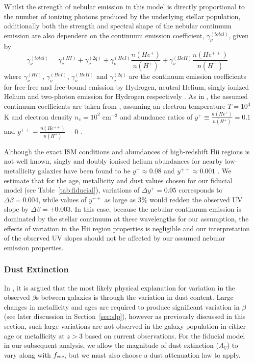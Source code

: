 Whilst the strength of nebular emission in this model is directly proportional to the number of ionizing photons produced by the underlying stellar population, additionally both the strength and spectral shape of the nebular continuum emission are also dependent on the continuum emission coefficient, $\gamma^{(total)}_{\nu}$, given by
\begin{equation}\label{eq:cont_sep}
\gamma^{(total)}_{\nu} = \gamma^{(HI)}_{\nu} + \gamma^{(2q)}_{\nu} +  \gamma^{(HeI)}_{\nu}\frac{n(He^{+})} {n(H^{+})} + \gamma^{(HeII)}_{\nu}\frac{n(He^{++})} {n(H^{+})}
\end{equation}
where $\gamma^{(HI)}_{\nu}$, $\gamma^{(HeI)}_{\nu}$, $\gamma^{(HeII)}_{\nu}$ and $\gamma^{(2q)}_{\nu}$ are the continuum emission coefficients for free-free and free-bound emission by Hydrogen, neutral Helium, singly ionized Helium and two-photon emission for Hydrogen respectively \citep{1995A&A...303...41K}. As in \citet{Duncan:2014gh}, the assumed continuum coefficients are taken from \citet{Osterbrock:2006ula}, assuming an electron temperature $T=10^4$ K and electron density $n_{e}=10^2$ cm$^{-3}$ and abundance ratios of $y^{+} \equiv \frac{n(He^{+})} {n(H^{+})} = 0.1$ and $y^{++} \equiv \frac{n(He^{++})} {n(H^{+})} = 0$ \citep{1995A&A...303...41K,Ono:2010ed}. 

Although the exact ISM conditions and abundances of high-redshift {\sc Hii} regions is not well known, singly and doubly ionised helium abundances for nearby low-metallicity galaxies have been found to be $y^{+} \approx 0.08$ and $y^{++} \approx 0.001$ \citep{Dinerstein:1986di,Izotov:1994fi,Hagele:2006eq}. We estimate that for the age, metallicity and dust values chosen for our fiducial model (see Table~\ref{tab:fiducial}), variations of $\Delta y^{+} = 0.05$ corresponds to $\Delta\beta = 0.004$, while values of $y^{++}$ as large as $3\%$ \citep{Izotov:2013ce} would redden the observed UV slope by $\Delta\beta = +0.003$. In this case, because the nebular continuum emission is dominated by the stellar continuum at these wavelengths for our assumption, the effects of variation in the {\sc Hii} region properties is negligible and our interpretation of the observed UV slopes should not be affected by our assumed nebular emission properties.

\subsubsection{Dust Extinction}\label{sec:models_dust}
In \citet{Bouwens:2009ik}, it is argued that the most likely physical explanation for variation in the observed $\beta$s between galaxies is through the variation in dust content. Large changes in metallicity and ages are required to produce significant variation in $\beta$ (see later discussion in Section~\ref{sec:slp}), however as previously discussed in this section, such large variations are not observed in the galaxy population in either age or metallicity at $z > 3$ based on current observations. For the fiducial model in our subsequent analysis, we allow the magnitude of dust extinction ($A_{V}$) to vary along with $f_{\rm{esc}}$, but we must also choose a dust attenuation law to apply.

